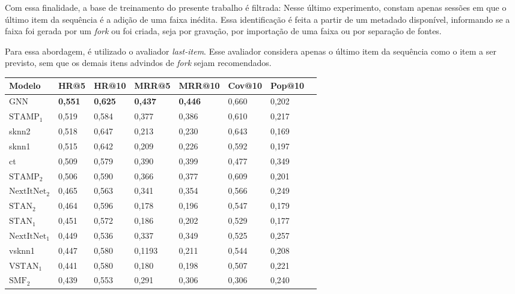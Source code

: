 Com essa finalidade, a base de treinamento do presente trabalho é filtrada:
Nesse último experimento, constam apenas sessões em que o último item da
sequência é a adição de uma faixa inédita. Essa identificação é feita a partir
de um metadado disponível, informando se a faixa foi gerada por um \textit{fork}
ou foi criada, seja por gravação, por importação de uma faixa ou por separação
de fontes.

Para essa abordagem, é utilizado o avaliador \textit{last-item}. Esse avaliador
considera apenas o último item da sequência como o item a ser previsto, sem que
os demais itens advindos de \textit{fork} sejam recomendados.

\begin{table}[htbp]
    \begin{tabular}{|l|l|l|l|l|l|l|l|}
      \hline
      Modelo & HR@5 & HR@10 & MRR@5 & MRR@10 & Cov@10 & Pop@10  \\
      \hline
      GNN & \textbf{0,551} & \textbf{0,625} & \textbf{0,437} & \textbf{0,446} & 0,660 & 0,202  \\
      \hline
      $\text{STAMP}_1$ & 0,519 & 0,584 & 0,377 & 0,386 & 0,610 & 0,217 \\
      \hline
      sknn2 & 0,518 & 0,647 & 0,213 & 0,230 & 0,643 & 0,169 \\
      \hline
      sknn1 & 0,515 & 0,642 & 0,209 & 0,226 & 0,592 & 0,197 \\
      \hline
      ct & 0,509 & 0,579 & 0,390 & 0,399  & 0,477 & 0,349 \\
      \hline
      $\text{STAMP}_2$ & 0,506 & 0,590 & 0,366 & 0,377 & 0,609 & 0,201 \\
      \hline
      $\text{NextItNet}_2$ & 0,465 & 0,563 & 0,341 & 0,354 & 0,566 & 0,249 \\
      \hline
      $\text{STAN}_2$ & 0,464 & 0,596 & 0,178 & 0,196 & 0,547 & 0,179 \\
      \hline
      $\text{STAN}_1$ & 0,451 & 0,572 & 0,186 & 0,202 & 0,529 & 0,177 \\
      \hline
      $\text{NextItNet}_1$ & 0,449 & 0,536 & 0,337 & 0,349 & 0,525 & 0,257\\
      \hline
      vsknn1 & 0,447 & 0,580 & 0,1193 & 0,211 & 0,544 & 0,208 \\
      \hline
      $\text{VSTAN}_1$ & 0,441 & 0,580 & 0,180 & 0,198 & 0,507 & 0,221 \\
      \hline
      $\text{SMF}_2$ & 0,439 & 0,553 & 0,291 & 0,306 & 0,306 & 0,240 \\
      \hline

\end{tabular}
\end{table}
